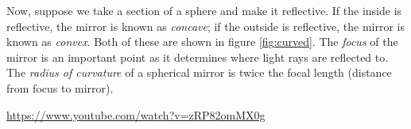 \documentclass[a4paper]{amsbook}
\begin{document}
Now, suppose we take a section of a sphere and make it reflective. If the inside is reflective, the mirror is known as \textit{concave};
if the outside is reflective, the mirror is known as \textit{convex}. Both of these are shown in figure \ref{fig:curved}. The \textit{focus}
of the mirror is an important point as it determines where light rays are reflected to. The \textit{radius of curvature} of a spherical
mirror is twice the focal length (distance from focus to mirror).

\begin{center}
\begin{tcolorbox}[width=0.8\textwidth,colback={red},title={\textbf{Go and watch...}},colbacktitle=yellow,coltitle=blue]
  \textcolor{white}{\url{https://www.youtube.com/watch?v=zRP82omMX0g}}
\end{tcolorbox}
\end{center}
\end{document}
